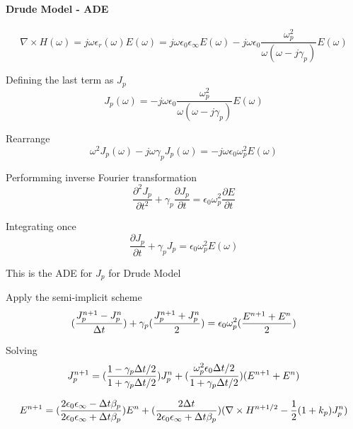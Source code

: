 \paragraph{{\msjh Drude Model - ADE}}
\begin{equation}
    \nabla \times H(\omega) = j\omega \epsilon_r(\omega)E(\omega) = j\omega\epsilon_0 \epsilon_{\infty} E(\omega) - j\omega\epsilon_0\frac{\omega_p^2}{\omega(\omega-j\gamma_p)}E(\omega)
\end{equation}

Defining the last term as $J_p$
\begin{equation}
  J_p(\omega) = -j\omega\epsilon_0\frac{\omega_p^2}{\omega(\omega-j\gamma_p)}E(\omega)
\end{equation}

Rearrange
\begin{equation}
  \omega^2J_p(\omega) - j\omega\gamma_pJ_p(\omega) = -j\omega\epsilon_0\omega_p^2 E(\omega)
\end{equation}

Performming inverse Fourier transformation
\begin{equation}
  \frac{\partial^2 J_p}{\partial t^2} + \gamma_p \frac{\partial J_p}{\partial t} = \epsilon_0\omega_p^2\frac{\partial E}{\partial t}
\end{equation}

Integrating once
\begin{equation}
  \frac{\partial J_p}{\partial t} + \gamma_p J_p = \epsilon_0 \omega_p^2 E(\omega)
\end{equation}

This is the ADE for $J_p$ for Drude Model

Apply the semi-implicit scheme
\begin{equation}
  \Huge(\frac{J_p^{n+1} - J_p^n}{\Delta t}\Huge) + \gamma_{p}\Huge(\frac{J_p^{n+1} + J_p^n}{2}\Huge) = \epsilon_0\omega_p^2\Huge(\frac{E^{n+1} + E^n}{2}\Huge)
\end{equation}

Solving
\begin{equation}
  J_p^{n+1} = \Huge(\frac{1-\gamma_p\Delta t /2}{1+\gamma_p\Delta t /2}\Huge)J_p^n + \Huge(\frac{\omega_p^2\epsilon_0\Delta t /2}{1+\gamma_p\Delta t /2}\Huge)(E^{n+1}+E^n)
\end{equation}


\begin{equation}
  E^{n+1} = \Huge(\frac{2\epsilon_0\epsilon_{\infty} - \Delta t \beta_p}{2\epsilon_0\epsilon_{\infty} + \Delta t \beta_p}\Huge)E^n + \Huge(\frac{2\Delta t}{2\epsilon_0\epsilon_{\infty} + \Delta t \beta_p}\Huge)\Huge(\nabla\times H^{n+1/2} - \frac{1}{2}(1+k_p)J_p^n\Huge)
\end{equation}



